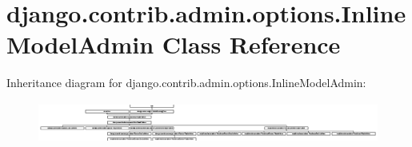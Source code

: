\hypertarget{classdjango_1_1contrib_1_1admin_1_1options_1_1_inline_model_admin}{}\section{django.\+contrib.\+admin.\+options.\+Inline\+Model\+Admin Class Reference}
\label{classdjango_1_1contrib_1_1admin_1_1options_1_1_inline_model_admin}
Inheritance diagram for django.\+contrib.\+admin.\+options.\+Inline\+Model\+Admin\+:\begin{figure}[H]
\begin{center}
\leavevmode
\includegraphics[height=1.353591cm]{classdjango_1_1contrib_1_1admin_1_1options_1_1_inline_model_admin}
\end{center}
\end{figure}
